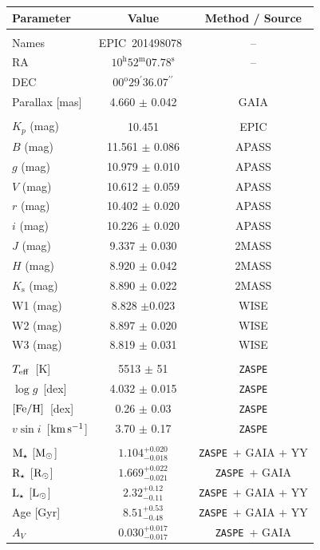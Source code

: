 \documentclass[useAMS,usenatbib]{mnras}
\newcommand{\feh}{\ensuremath{{\rm [Fe/H]}}}
\newcommand{\teff}{\ensuremath{T_{\rm eff}}}
\newcommand{\logg}{\ensuremath{\log{g}}}
\newcommand{\zaspe}{\texttt{ZASPE}}
\newcommand{\vsini}{\ensuremath{v \sin{i}}}
\newcommand{\kms}{\ensuremath{{\rm km\,s^{-1}}}}
\newcommand{\rstar}{\ensuremath{{\rm R}_{\star}}}
\newcommand{\mstar}{\ensuremath{{\rm M}_{\star}}}
\newcommand{\lstar}{\ensuremath{{\rm L}_{\star}}}
\newcommand{\rsun}{\ensuremath{{\rm R}_{\odot}}}
\newcommand{\msun}{\ensuremath{{\rm M}_{\odot}}}
\newcommand{\lsun}{\ensuremath{{\rm L}_{\odot}}}
\newcommand{\stname}{EPIC~201498078}
\begin{document}
\begin{table}
\begin{tabular}{@{}lcc@{}}
  Parameter      &   Value &  Method / Source \\
 \hline
 \\
Names     & \stname\ & -- \\
RA            & $10^\mathrm{h}52^\mathrm{m}07.78^\mathrm{s}$ & -- \\
DEC           & $00^\text{o}29^\prime36.07^{\prime\prime}$ &   \\
Parallax  [mas]    & 4.660 $\pm$ 0.042 & GAIA\\
\hline
\\
$K_p$ (mag) & 10.451 & EPIC\\
$B$ (mag) &11.561 $\pm$ 0.086 & APASS\\
$g$ (mag) & 10.979 $\pm$  0.010 & APASS\\
$V$ (mag) & 10.612 $\pm$  0.059 & APASS\\
$r$ (mag) & 10.402 $\pm$  0.020 & APASS\\
$i$ (mag) & 10.226 $\pm$  0.020  & APASS \\
$J$ (mag) & 9.337 $\pm$ 0.030 & 2MASS\\
$H$ (mag) & 8.920 $\pm$ 0.042 & 2MASS\\
$K_\mathrm{s}$ (mag) & 8.890 $\pm$ 0.022& 2MASS\\
W1 (mag) & 8.828 $\pm$0.023& WISE\\
W2 (mag) & 8.897 $\pm$ 0.020& WISE\\
W3 (mag) & 8.819 $\pm$ 0.031& WISE\\
\hline
\\
\teff\  [K] &  5513 $\pm$ 51 & \zaspe \\
\logg\ [dex]     &  4.032 $\pm$ 0.015 & \zaspe \\
\feh\ [dex]    &  0.26 $\pm$ 0.03 & \zaspe \\
\vsini\ [\kms] & 3.70 $\pm$ 0.17 & \zaspe \\
\hline
\\
\mstar{} [\msun] &  $1.104_{-0.018}^{+0.020}$ & \zaspe\ + GAIA + YY \\
\rstar{} [\rsun] & $1.669_{-0.021}^{+0.022}$ & \zaspe\ + GAIA  \\
\lstar{}  [\lsun] & $2.32_{-0.11}^{+0.12}$ & \zaspe\ + GAIA  + YY\\
Age    [Gyr]        &    $8.51_{-0.48}^{+0.53}$ & \zaspe\ + GAIA + YY \\
$A_V$  &  $0.030_{-0.017}^{+0.017}$ & \zaspe\ + GAIA  \\
\hline

\end{tabular}
\end{table}
\end{document}
